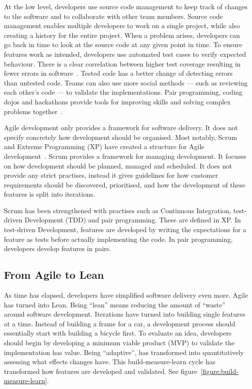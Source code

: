 \documentclass[english]{tktltiki2}
\begin{document}
At the low level, developers use source code management to keep track of changes to the software and to collaborate with other team members. Source code management enables multiple developers to work on a single project, while also creating a history for the entire project. When a problem arises, developers can go back in time to look at the source code at any given point in time. To ensure features work as intended, developers use automated test cases to verify expected behaviour. There is a clear correlation between higher test coverage resulting in fewer errors in software~\cite{MND09}. Tested code has a better change of detecting errors than untested code. Teams can also use more social methods — such as reviewing each other’s code — to validate the implementations. Pair programming, coding dojos and hackathons provide tools for improving skills and solving complex problems together~\cite{HHL13}.

Agile development only provides a framework for software delivery. It does not specify concretely how development should be organised. Most notably, Scrum and Extreme Programming (XP) have created a structure for Agile development~\cite{LB03, Fow05, SS10}. Scrum provides a framework for managing development. It focuses on how development should be planned, managed and scheduled. It does not provide any strict practises, instead it gives guidelines for how customer requirements should be discovered, prioritised, and how the development of these features is split into iterations.

Scrum has been strengthened with practises such as Continuous Integration, test-driven Development (TDD) and pair programming. These are defined in XP. In test-driven Development, features are developed by writing the expectations for a feature as tests before actually implementing the code. In pair programming, developers develop features in pairs.

\subsection{From Agile to Lean}

As time has elapsed, developers have simplified software delivery even more. Agile has turned into Lean. Being “lean” means reducing the amount of “waste” around software development. Iterations have turned into building single features at a time. Instead of building a frame for a car, a development process should essentially start with building a bicycle first. To evaluate an idea, developers should begin by developing a minimum viable product (MVP) to validate the implementation has value. Being “adaptive”, has transformed into quantitatively assessing what effects changes have. This build-measure-learn cycle has transformed how features are developed and validated. See figure~\ref{figure:build-measure-learn}.
\end{document}
